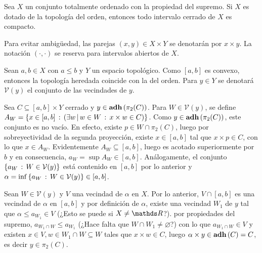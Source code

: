 \begin{Teo}
  Sea $X$ un conjunto totalmente ordenado con la propiedad del supremo. Si $X$
  es dotado de la topología del orden, entonces todo intervalo cerrado de $X$
  es compacto.
\end{Teo}
\begin{Demo}
  Para evitar ambigüedad, las parejas $(x,y)\in X\times Y$ se denotarán por $x\times y$.
  La notación $(\cdot,\cdot)$ se reserva para intervalos abiertos de $X$.

  Sean $a,b\in X$ con $a\leq b$ y $Y$ un espacio topológico. Como $[a,b]$ es convexo,
  entonces la topología heredada coincide con la del orden. Para $y\in Y$ se denotará
  $\mathcal{V}(y)$ el conjunto de las vecindades de $y$.

  Sea $C\subseteq[a,b]\times Y$ cerrado y $y\in\Adh(\pi_2(C))$. Para $W\in\mathcal{V}(y)$,
  se define $A_W=\set{x\in[a,b]}{\Exists{w}[w\in W]{x\times w\in C}}$. Como
  $y\in\Adh(\pi_2(C))$, este conjunto es no vacío. En efecto, existe $p\in W\cap\pi_2(C)$,
  luego por sobreyectividad de la segunda proyección, existe $x\in [a,b]$ tal que
  $x\times p\in C$, con lo que $x\in A_W$. Evidentemente $A_W\subseteq[a,b]$,
  luego es acotado superiormente por $b$ y en consecuencia, $a_W=\sup A_W\in [a,b]$.
  Análogamente, el conjunto $\left\{a_W\,:\,W\in\mathcal{V}(y)\right\}$ está contenido en $[a,b]$
  por lo anterior y $\alpha=\inf\left\{a_W\,:\,W\in\mathcal{V}(y)\right\}\in[a,b]$.

  Sean $W\in\mathcal{V}(y)$ y $V$ una vecindad de $\alpha$ en $X$. Por lo anterior, $V\cap[a,b]$
  es una vecindad de $\alpha$ en $[a,b]$ y por definición de $\alpha$, existe
  una vecindad $W_1$ de $y$ tal que $\alpha\leq a_{W_1}\in V$ (¿Esto se puede si $X\neq \R$?).
  por propiedades del supremo, $a_{W_1\cap W}\leq a_{W_1}$
  (¿Hace falta que $W\cap W_1\neq\varnothing$?) con lo que
  $a_{W_1\cap W}\in V$ y existen $x\in V,w\in W_1\cap W\subseteq W$ tales que $x\times w\in C$,
  luego $\alpha\times y\in\Adh(C)=C$, es decir $y\in\pi_2(C)$.
\end{Demo}